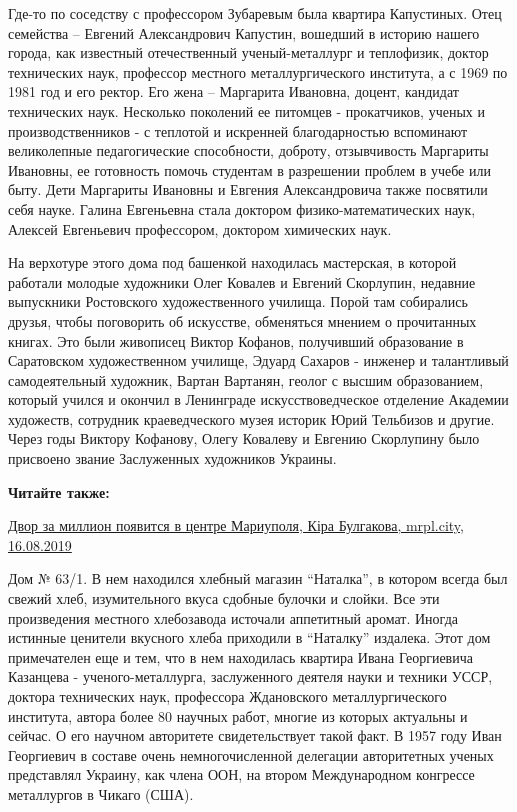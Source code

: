 Где-то по соседству с профессором Зубаревым была квартира Капустиных. Отец
семейства – Евгений Александрович Капустин, вошедший в историю нашего города,
как известный отечественный ученый-металлург и теплофизик, доктор технических
наук, профессор местного металлургического института, а с 1969 по 1981 год и
его ректор. Его жена – Маргарита Ивановна, доцент, кандидат технических наук.
Несколько поколений ее питомцев - прокатчиков, ученых и производственников - с
теплотой и искренней благодарностью вспоминают великолепные педагогические
способности, доброту, отзывчивость Маргариты Ивановны, ее готовность помочь
студентам в разрешении проблем в учебе или быту. Дети Маргариты Ивановны и
Евгения Александровича также посвятили себя науке. Галина Евгеньевна стала
доктором физико-математических наук, Алексей Евгеньевич профессором, доктором
химических наук.

На верхотуре этого дома под башенкой находилась мастерская, в которой работали
молодые художники Олег Ковалев и Евгений Скорлупин, недавние выпускники
Ростовского художественного училища. Порой там собирались друзья, чтобы
поговорить об искусстве, обменяться мнением о прочитанных книгах. Это были
живописец Виктор Кофанов, получивший образование в Саратовском художественном
училище, Эдуард Сахаров - инженер и талантливый самодеятельный художник, Вартан
Вартанян, геолог с высшим образованием, который учился и окончил в Ленинграде
искусствоведческое отделение Академии художеств, сотрудник краеведческого музея
историк Юрий Тельбизов и другие. Через годы Виктору Кофанову, Олегу Ковалеву и
Евгению Скорлупину было присвоено звание Заслуженных художников Украины.

\vspace{0.5cm}
\begin{minipage}{0.9\textwidth}
\textbf{Читайте также:} 

\href{https://mrpl.city/news/view/dvor-za-million-poyavitsya-v-tsentre-mariupolya-foto}{%
Двор за миллион появится в центре Мариуполя, Кіра Булгакова, mrpl.city, 16.08.2019}
\end{minipage}
\vspace{0.5cm}

Дом № 63/1. В нем находился хлебный магазин \enquote{Наталка}, в котором всегда был
свежий хлеб, изумительного вкуса сдобные булочки и слойки. Все эти произведения
местного хлебозавода источали аппетитный аромат. Иногда истинные ценители
вкусного хлеба приходили в \enquote{Наталку} издалека. Этот дом примечателен еще и тем,
что в нем находилась квартира Ивана Георгиевича Казанцева - ученого-металлурга,
заслуженного деятеля науки и техники УССР, доктора технических наук, профессора
Ждановского металлургического института, автора более 80 научных работ, многие
из которых актуальны и сейчас. О его научном авторитете свидетельствует такой
факт. В 1957 году Иван Георгиевич в составе очень немногочисленной делегации
авторитетных ученых представлял Украину, как члена ООН, на втором Международном
конгрессе металлургов в Чикаго (США).


